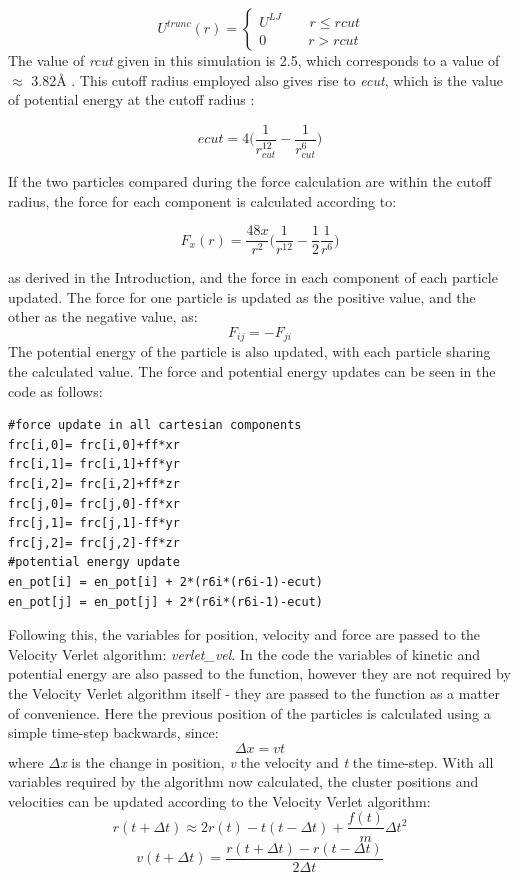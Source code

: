 \documentclass{article}
\begin{document}
\begin{multicols}{2}
  \[
    \ U^{trunc}(r)=\left\{
                \begin{array}{ll}
                  U^{LJ} \qquad r\leq rcut\\
                  0 \qquad \quad r > rcut
                \end{array}
              \right.
  \]
The value of \textit{rcut} given in this simulation is 2.5, which corresponds to a value of $\approx$ 3.82\AA  \cite{ercolessi} . This cutoff radius employed also gives rise to \textit{ecut}, which is the value of potential energy at the cutoff radius \cite{frenkel}:

\[ecut=4 \Bigg( \frac{1}{r_{cut}^{12}} - \frac{1}{r_{cut}^6} \Bigg)\]

If the two particles compared during the force calculation are within the cutoff radius, the force for each component is calculated according to:

\[F_x(r) = \frac{48x}{r^2} \Big(\frac{1}{r^{12}} - \frac{1}{2} \frac{1}{r^6}\Big) \]

as derived in the Introduction, and the force in each component of each particle updated. The force for one particle is updated as the positive value, and the other as the negative value, as:
\[F_{ij} = -F_{ji}\]
The potential energy of the particle is also updated, with each particle sharing the calculated value. The force and potential energy updates can be seen in the code as follows:
\begin{flushleft}
\captionsetup[lstlisting]{position=bottom,font=footnotesize}
\renewcommand{\lstlistingname}{Code}
\begin{lstlisting}
#force update in all cartesian components		
frc[i,0]= frc[i,0]+ff*xr
frc[i,1]= frc[i,1]+ff*yr
frc[i,2]= frc[i,2]+ff*zr
frc[j,0]= frc[j,0]-ff*xr
frc[j,1]= frc[j,1]-ff*yr
frc[j,2]= frc[j,2]-ff*zr
#potential energy update
en_pot[i] = en_pot[i] + 2*(r6i*(r6i-1)-ecut) 
en_pot[j] = en_pot[j] + 2*(r6i*(r6i-1)-ecut)
\end{lstlisting}
\end{flushleft}

Following this, the variables for position, velocity and force are passed to the Velocity Verlet algorithm: \textit{verlet\_vel}. In the code the variables of kinetic and potential energy are also passed to the function, however they are not required by the Velocity Verlet algorithm itself - they are passed to the function as a matter of convenience. Here the previous position of the particles is calculated using a simple time-step backwards, since:
\[\Delta x = v t\]
where \textit{$\Delta$x} is the change in position, \textit{v} the velocity and \textit{t} the time-step. With all variables required  by the algorithm now calculated, the cluster positions and velocities can be updated according to the Velocity Verlet algorithm:
\[r(t+\Delta t) \approx 2r(t) - t(t-\Delta t) + \frac{f(t)}{m}\Delta t^{2}\]
\[v(t+\Delta t) = \frac{r(t+\Delta t) - r(t-\Delta t)}{2\Delta t}\]


\end{multicols}
\end{document}
